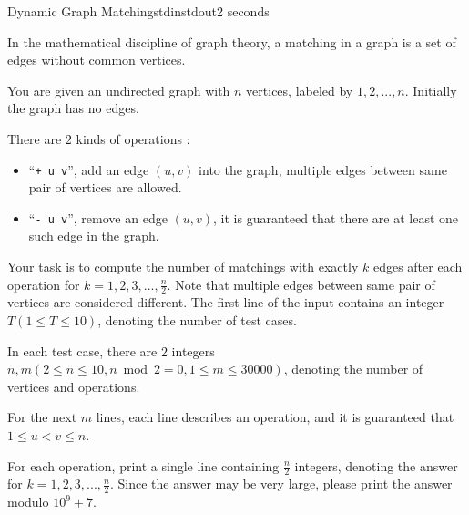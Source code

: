 \documentclass[11pt,a4paper,oneside]{article}
\newcommand{\txt}[1]{\mbox{``\texttt{#1}''}}
\newcommand{\timeLimit}{2 seconds}
\renewcommand{\defaultmemorylimit}{512 megabytes}
\begin{document}
\begin{problem}{Dynamic Graph Matching}{stdin}{stdout}{\timeLimit}

In the mathematical discipline of graph theory, a matching in a graph is a set of edges without common vertices.\par
You are given an undirected graph with $n$ vertices, labeled by $1,2,...,n$. Initially the graph has no edges.\par
There are $2$ kinds of operations :\par
\begin{itemize}
   \item \txt{+ u v}, add an edge $(u,v)$ into the graph, multiple edges between same pair of vertices are allowed.
   \item \txt{- u v}, remove an edge $(u,v)$, it is guaranteed that there are at least one such edge in the graph.
\end{itemize}\par
Your task is to compute the number of matchings with exactly $k$ edges after each operation for $k=1,2,3,...,\frac{n}{2}$. Note that multiple edges between same pair of vertices are considered different.
\InputFile
The first line of the input contains an integer $T(1\leq T\leq10)$, denoting the number of test cases.\par
In each test case, there are $2$ integers $n,m(2\leq n\leq 10,n \bmod 2=0,1\leq m\leq 30000)$, denoting the number of vertices and operations.\par
For the next $m$ lines, each line describes an operation, and it is guaranteed that $1\leq u<v\leq n$.\par

\OutputFile
For each operation, print a single line containing $\frac{n}{2}$ integers, denoting the answer for $k=1,2,3,...,\frac{n}{2}$. Since the answer may be very large, please print the answer modulo $10^9+7$.

\Examples
\begin{example}
%
\end{example}
\end{problem}
\renewcommand{\timeLimit}{1 second}
\renewcommand{\defaultmemorylimit}{512 megabytes}
\end{document}

